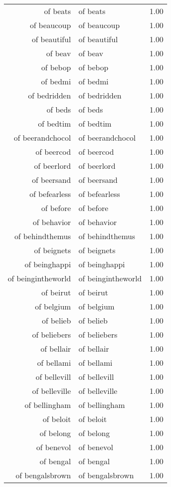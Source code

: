 \begin{table}[ht]
\begin{tabular}{rlr}
  of beats & of beats & 1.00 \\ 
  of beaucoup & of beaucoup & 1.00 \\ 
  of beautiful & of beautiful & 1.00 \\ 
  of beav & of beav & 1.00 \\ 
  of bebop & of bebop & 1.00 \\ 
  of bedmi & of bedmi & 1.00 \\ 
  of bedridden & of bedridden & 1.00 \\ 
  of beds & of beds & 1.00 \\ 
  of bedtim & of bedtim & 1.00 \\ 
  of beerandchocol & of beerandchocol & 1.00 \\ 
  of beercod & of beercod & 1.00 \\ 
  of beerlord & of beerlord & 1.00 \\ 
  of beersand & of beersand & 1.00 \\ 
  of befearless & of befearless & 1.00 \\ 
  of before & of before & 1.00 \\ 
  of behavior & of behavior & 1.00 \\ 
  of behindthemus & of behindthemus & 1.00 \\ 
  of beignets & of beignets & 1.00 \\ 
  of beinghappi & of beinghappi & 1.00 \\ 
  of beingintheworld & of beingintheworld & 1.00 \\ 
  of beirut & of beirut & 1.00 \\ 
  of belgium & of belgium & 1.00 \\ 
  of belieb & of belieb & 1.00 \\ 
  of beliebers & of beliebers & 1.00 \\ 
  of bellair & of bellair & 1.00 \\ 
  of bellami & of bellami & 1.00 \\ 
  of bellevill & of bellevill & 1.00 \\ 
  of belleville & of belleville & 1.00 \\ 
  of bellingham & of bellingham & 1.00 \\ 
  of beloit & of beloit & 1.00 \\ 
  of belong & of belong & 1.00 \\ 
  of benevol & of benevol & 1.00 \\ 
  of bengal & of bengal & 1.00 \\ 
  of bengalsbrown & of bengalsbrown & 1.00 \\ 

\end{tabular}
\end{table}
